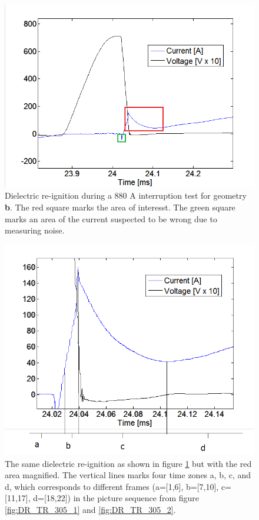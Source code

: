 \documentclass[10pt,b5paper,twoside]{article}
\begin{document}
\begin{figure}[H]
\centering
\includegraphics[scale=0.55]{Bilder/Results/DRplot_calc_areas.png}
\caption{Dielectric re-ignition during a 880 A interruption test for geometry \textbf{b}. The red square marks the area of interesst. The green square marks an area of the current suspected to be wrong due to measuring noise.} \label{fig:DR_disc_calc_areas}
\end{figure}

\begin{figure}[H]
\centering
\includegraphics[scale=0.55]{Bilder/Results/DRplot2_zoom.PNG}
\caption{The same dielectric re-ignition as shown in figure \ref{fig:DR_disc_calc_areas} but with the red area magnified. The vertical lines marks four time zones a, b, c, and d, which corresponds to different frames (a=[1,6], b=[7,10], c=[11,17], d=[18,22]) in the picture sequence from figure \ref{fig:DR_TR_305_1} and \ref{fig:DR_TR_305_2}.}
\label{fig:DR_zoom_and_areas}
\end{figure}
\end{document}
